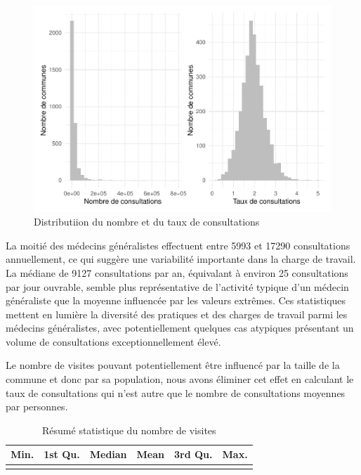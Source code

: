 \documentclass[
]{article}
\begin{document}
\begin{figure}

{\centering \includegraphics{4_Analyse_Descriptive_files/figure-latex/unnamed-chunk-6-1} 

}

\caption{Distributiion du nombre et du taux de consultations}\label{fig:unnamed-chunk-6}
\end{figure}

La moitié des médecins généralistes effectuent entre 5993 et 17290
consultations annuellement, ce qui suggère une variabilité importante
dans la charge de travail. La médiane de 9127 consultations par an,
équivalant à environ 25 consultations par jour ouvrable, semble plus
représentative de l'activité typique d'un médecin généraliste que la
moyenne influencée par les valeurs extrêmes. Ces statistiques mettent en
lumière la diversité des pratiques et des charges de travail parmi les
médecins généralistes, avec potentiellement quelques cas atypiques
présentant un volume de consultations exceptionnellement élevé.

Le nombre de visites pouvant potentiellement être influencé par la
taille de la commune et donc par sa population, nous avons éliminer cet
effet en calculant le taux de consultations qui n'est autre que le
nombre de consultations moyennes par personnes.

\begin{table}[H]
\centering
\caption{\label{tab:unnamed-chunk-7}Résumé statistique du nombre de visites}
\centering
\begin{tabular}[t]{rrrrrr}
\toprule
Min. & 1st Qu. & Median & Mean & 3rd Qu. & Max.\\
\midrule
\cellcolor{gray!10}{1037} & \cellcolor{gray!10}{5993} & \cellcolor{gray!10}{9127} & \cellcolor{gray!10}{19129.63} & \cellcolor{gray!10}{17290} & \cellcolor{gray!10}{765833}\\
\bottomrule
\end{tabular}
\end{table}
\end{document}

